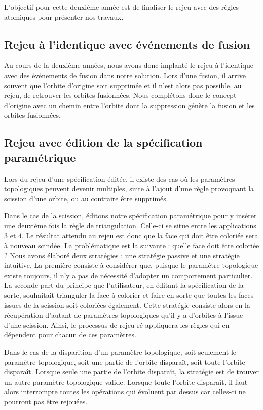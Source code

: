 L'objectif pour cette deuxième année est de finaliser le rejeu avec des règles
atomiques pour présenter nos travaux. %

\subsection{Rejeu à l'identique avec événements de fusion}

Au cours de la deuxième années, nous avons donc implanté le rejeu à l'identique
avec des événements de fusion dans notre solution. %
Lors d'une fusion, il arrive souvent que l'orbite d'origine soit supprimée et il
n'est alors pas possible, au rejeu, de retrouver les orbites fusionnées. %
Nous complétons donc le concept d'origine avec un chemin entre l'orbite dont la
suppression génère la fusion et les orbites fusionnées. %


\subsection{Rejeu avec édition de la spécification paramétrique}

Lors du rejeu d'une spécification éditée, il existe des cas où les paramètres
topologiques peuvent devenir multiples, suite à l'ajout d'une règle provoquant
la scission d'une orbite, ou au contraire être supprimés. %

Dans le cas de la scission, éditons notre spécification paramétrique pour y
insérer une deuxième fois la règle de triangulation. %
Celle-ci se situe entre les applications $3$ et $4$. %
Le résultat attendu au rejeu est donc que la face qui doit être coloriée sera à
nouveau scindée. %
La problématique est la suivante : quelle face doit être coloriée ? %
Nous avons élaboré deux stratégies : une stratégie passive et une stratégie
intuitive. %
La première consiste à considérer que, puisque le paramètre topologique existe
toujours, il n'y a pas de nécessité d'adopter un comportement particulier. %
La seconde part du principe que l'utilisateur, en éditant la spécification de la
sorte, souhaitait trianguler la face à colorier et faire en sorte que toutes les
faces issues de la scission soit coloriées également. %
Cette stratégie consiste alors en la récupération d'autant de paramètres
topologiques qu'il y a d'orbites à l'issue d'une scission. %
Ainsi, le processus de rejeu ré-appliquera les règles qui en dépendent pour
chacun de ces paramètres. %

Dans le cas de la disparition d'un paramètre topologique, soit seulement le
paramètre topologique, soit une partie de l'orbite disparaît, soit toute
l'orbite disparaît. %
Lorsque seule une partie de l'orbite disparaît, la stratégie est de trouver un
autre paramètre topologique valide. %
Lorsque toute l'orbite disparaît, il faut alors interrompre toutes les
opérations qui évoluent par dessus car celles-ci ne pourront pas être
rejouées. %

